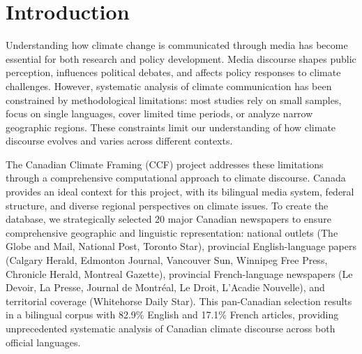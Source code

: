 \documentclass[12pt]{article}
\begin{document}
\newpage
\tableofcontents
\newpage


\section{Introduction}

Understanding how climate change is communicated through media has become essential for both research and policy development. Media discourse shapes public perception, influences political debates, and affects policy responses to climate challenges. However, systematic analysis of climate communication has been constrained by methodological limitations: most studies rely on small samples, focus on single languages, cover limited time periods, or analyze narrow geographic regions. These constraints limit our understanding of how climate discourse evolves and varies across different contexts.

The Canadian Climate Framing (CCF) project addresses these limitations through a comprehensive computational approach to climate discourse. Canada provides an ideal context for this project, with its bilingual media system, federal structure, and diverse regional perspectives on climate issues. To create the database, we strategically selected 20 major Canadian newspapers to ensure comprehensive geographic and linguistic representation: national outlets (The Globe and Mail, National Post, Toronto Star), provincial English-language papers (Calgary Herald, Edmonton Journal, Vancouver Sun, Winnipeg Free Press, Chronicle Herald, Montreal Gazette), provincial French-language newspapers (Le Devoir, La Presse, Journal de Montréal, Le Droit, L'Acadie Nouvelle), and territorial coverage (Whitehorse Daily Star). This pan-Canadian selection results in a bilingual corpus with 82.9\% English and 17.1\% French articles, providing unprecedented systematic analysis of Canadian climate discourse across both official languages.
\end{document}
